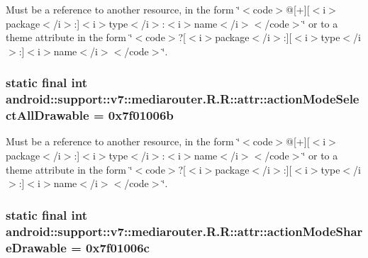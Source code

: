 Must be a reference to another resource, in the form \char`\"{}$<$code$>$@\mbox{[}+\mbox{]}\mbox{[}$<$i$>$package$<$/i$>$:\mbox{]}$<$i$>$type$<$/i$>$:$<$i$>$name$<$/i$>$$<$/code$>$\char`\"{} or to a theme attribute in the form \char`\"{}$<$code$>$?\mbox{[}$<$i$>$package$<$/i$>$:\mbox{]}\mbox{[}$<$i$>$type$<$/i$>$:\mbox{]}$<$i$>$name$<$/i$>$$<$/code$>$\char`\"{}. \hypertarget{classandroid_1_1support_1_1v7_1_1mediarouter_1_1_r_1_1attr_add7771cf89b89302a5beeacb7e49cea}{
\subsubsection[{actionModeSelectAllDrawable}]{\setlength{\rightskip}{0pt plus 5cm}static final int android::support::v7::mediarouter.R.R::attr::actionModeSelectAllDrawable = 0x7f01006b}}
\label{classandroid_1_1support_1_1v7_1_1mediarouter_1_1_r_1_1attr_add7771cf89b89302a5beeacb7e49cea}


Must be a reference to another resource, in the form \char`\"{}$<$code$>$@\mbox{[}+\mbox{]}\mbox{[}$<$i$>$package$<$/i$>$:\mbox{]}$<$i$>$type$<$/i$>$:$<$i$>$name$<$/i$>$$<$/code$>$\char`\"{} or to a theme attribute in the form \char`\"{}$<$code$>$?\mbox{[}$<$i$>$package$<$/i$>$:\mbox{]}\mbox{[}$<$i$>$type$<$/i$>$:\mbox{]}$<$i$>$name$<$/i$>$$<$/code$>$\char`\"{}. \hypertarget{classandroid_1_1support_1_1v7_1_1mediarouter_1_1_r_1_1attr_729c78c7b5c738fec2e614ac6cbcb1b0}{
\subsubsection[{actionModeShareDrawable}]{\setlength{\rightskip}{0pt plus 5cm}static final int android::support::v7::mediarouter.R.R::attr::actionModeShareDrawable = 0x7f01006c}}
\label{classandroid_1_1support_1_1v7_1_1mediarouter_1_1_r_1_1attr_729c78c7b5c738fec2e614ac6cbcb1b0}



